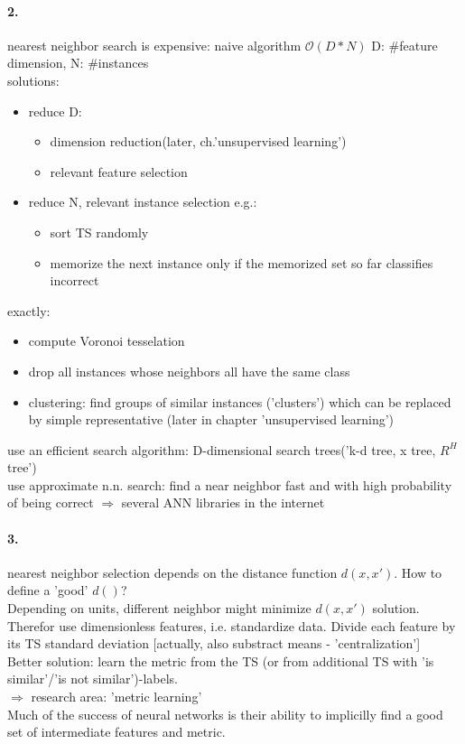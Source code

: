 \documentclass[11pt]{article}
\begin{document}
        \paragraph{2.}
          nearest neighbor search is expensive: naive algorithm $\mathcal{O}
          (D*N)$ D: #feature dimension, N: #instances \\
          solutions:
          \begin{itemize}
            \item reduce D:
            \begin{itemize}
              \item dimension reduction(later, ch.'unsupervised learning')
              \item relevant feature selection
            \end{itemize}
            \item reduce N, relevant instance selection e.g.:
            \begin{itemize}
              \item sort TS randomly
              \item memorize the next instance only if the memorized
              set so far classifies incorrect
            \end{itemize}
          \end{itemize}
          exactly:
          \begin{itemize}
            \item compute Voronoi tesselation
            \item drop all instances whose neighbors all have the same class
            \item clustering: find groups of similar instances ('clusters')
            which can be replaced by simple representative (later in chapter
            'unsupervised learning')
          \end{itemize}
          use an efficient search algorithm: D-dimensional search trees('k-d
          tree, x tree, $R^H$ tree') \\
          use approximate n.n. search: find a near neighbor fast and with high
          probability of being correct $\Rightarrow$ several ANN libraries in
          the internet
        \paragraph{3.}
          nearest neighbor selection depends on the distance function $d(x,x')$.
          How to define a 'good' $d()$? \\
          Depending on units, different neighbor might minimize $d(x,x')$
          solution. Therefor use dimensionless features, i.e. standardize data.
          Divide each feature by its TS standard deviation [actually, also
          substract means - 'centralization'] \\
          Better solution: learn the metric from the TS (or from additional
          TS with 'is similar'/'is not similar')-labels. \\
          $\Rightarrow$ research area: 'metric learning' \\
          Much of the success of neural networks is their ability to
          implicilly find a good set of intermediate features and metric.
\end{document}
